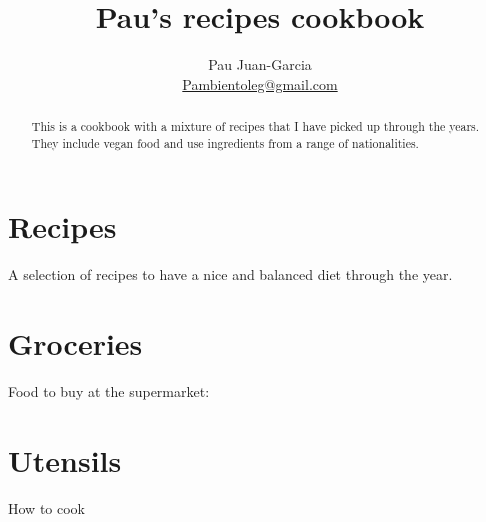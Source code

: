 \documentclass[%
a4paper,
11pt
]{article}
\begin{document}
\title{Pau's recipes cookbook}
\author{Pau Juan-Garcia\\ \href{mailto:Pambientoleg@gmail.com}{Pambientoleg@gmail.com}}
\maketitle

\begin{abstract}
    \noindent This is a cookbook with a mixture of recipes that I have picked up through the years. They include vegan food and use ingredients from a range of nationalities.
\end{abstract}

\tableofcontents

\vspace{5em}

\section{Recipes}
A selection of recipes to have a nice and balanced diet through the year.



%
%
%
%
%
%
%
%
%
%
%
%
%
%
%
%
%
%
%
%
%
%
%
%
%
%
%
%
%
%
%
%
%
%
%
%
%
%
%

\section{Groceries}
Food to buy at the supermarket:


\section{Utensils}
How to cook

\end{document}
